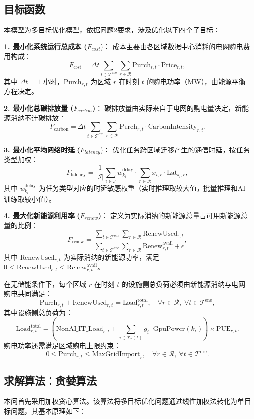 \documentclass[UTF8,a4paper,zihao=-4]{ctexart}
\begin{document}
\subsection{目标函数}

本模型为多目标优化模型，依据问题2要求，涉及优化以下四个子目标：

\textbf{1. 最小化系统运行总成本 ($F_{cost}$)}：
成本主要由各区域数据中心消耗的电网购电费用构成：
\[
F_{\text{cost}} = \Delta t \sum_{t \in \mathcal{T}^{\text{ene}}} \sum_{r \in \mathcal{R}} \text{Purch}_{r,t} \cdot \text{Price}_{r,t},
\]
其中 $\Delta t = 1$ 小时，$\text{Purch}_{r,t}$ 为区域 $r$ 在时刻 $t$ 的购电功率（MW），由能源平衡方程决定。

\textbf{2. 最小化总碳排放量 ($F_{carbon}$)}：
碳排放量由实际来自于电网的购电量决定，新能源消纳不计碳排放：
\[
F_{\text{carbon}} = \Delta t \sum_{t \in \mathcal{T}^{\text{ene}}} \sum_{r \in \mathcal{R}} \text{Purch}_{r,t} \cdot \text{CarbonIntensity}_{r,t}.
\]

\textbf{3. 最小化平均网络时延 ($F_{latency}$)}：
优化任务跨区域迁移产生的通信时延，按任务类型加权：
\[
F_{\text{latency}} = \frac{1}{|\mathcal{I}|} \sum_{i \in \mathcal{I}} w_{k_i}^{\text{delay}} \cdot \sum_{r \in \mathcal{R}} x_{i,r} \cdot \text{Lat}_{o_i, r},
\]
其中 $w_{k_i}^{\text{delay}}$ 为任务类型对应的时延敏感权重（实时推理取较大值，批量推理和AI训练取较小值）。

\textbf{4. 最大化新能源利用率 ($F_{renew}$)}：
定义为实际消纳的新能源总量占可用新能源总量的比例：
\[
F_{\text{renew}} = \frac{\sum_{t \in \mathcal{T}^{\text{ene}}} \sum_{r \in \mathcal{R}} \text{RenewUsed}_{r,t}}{\sum_{t \in \mathcal{T}^{\text{ene}}} \sum_{r \in \mathcal{R}} \text{Renew}_{r,t}^{\text{avail}} + \epsilon},
\]
其中 $\text{RenewUsed}_{r,t}$ 为实际消纳的新能源功率，满足 $0 \leq \text{RenewUsed}_{r,t} \leq \text{Renew}_{r,t}^{\text{avail}}$。


在无储能条件下，每个区域 $r$ 在时刻 $t$ 的设施侧总负荷必须由新能源消纳与电网购电共同满足：
\[
\text{Purch}_{r,t} + \text{RenewUsed}_{r,t} = \text{Load}_{r,t}^{\text{total}}, \quad \forall r \in \mathcal{R},\; \forall t \in \mathcal{T}^{\text{ene}},
\]
其中设施侧总负荷为：
\[
\text{Load}_{r,t}^{\text{total}} = \left( \text{NonAI\_IT\_Load}_{r,t} + \sum_{i \in \mathcal{T}_r(t)} g_i \cdot \text{GpuPower}(k_i) \right) \times \text{PUE}_{r,t}.
\]
购电功率还需满足区域购电上限约束：
\[
0 \leq \text{Purch}_{r,t} \leq \text{MaxGridImport}_r, \quad \forall r \in \mathcal{R},\; \forall t \in \mathcal{T}^{\text{ene}}.
\]


\subsection{求解算法：贪婪算法}
本问首先采用加权贪心算法。该算法将多目标优化问题通过线性加权法转化为单目标问题，其基本原理如下：
\end{document}
